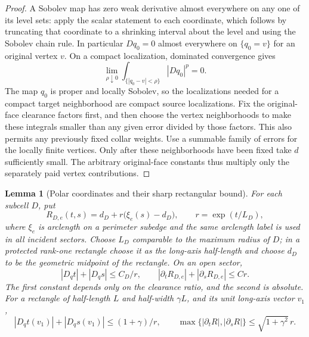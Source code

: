 \documentclass[11pt]{article}
\numberwithin{equation}{section}
\newtheorem{lemma}[theorem]{Lemma}
\theoremstyle{definition}
\theoremstyle{remark}
\begin{document}
\begin{proof}
A Sobolev map has zero weak derivative almost everywhere on any one
of its level sets: apply the scalar statement to each coordinate,
which follows by truncating that coordinate to a shrinking interval
about the level and using the Sobolev chain rule.  In particular
$Dq_0=0$ almost everywhere on $\{q_0=v\}$ for an original vertex $v$.
On a compact localization, dominated convergence gives
\[
 \lim_{\rho\downarrow0}
 \int_{\{|q_0-v|<\rho\}}|Dq_0|^p=0.
\]
The map $q_0$ is proper and locally Sobolev, so the localizations needed
for a compact target neighborhood are compact source localizations.
Fix the original-face clearance factors first, and then choose the
vertex neighborhoods to make these integrals smaller than any given
error divided by those factors.  This also permits any previously
fixed collar weights.  Use a summable family of errors for the locally
finite vertices.  Only after these neighborhoods have been fixed take
$d$ sufficiently small.  The arbitrary original-face constants thus
multiply only the separately paid vertex contributions.
\end{proof}

\begin{lemma}[Polar coordinates and their sharp rectangular bound]\label{qt:polar}
For each subcell $D$, put
\[
 R_{D,e}(t,s)=d_D+r\bigl(\xi_e(s)-d_D\bigr),\qquad
 r=\exp(t/L_D),
\]
where $\xi_e$ is arclength on a perimeter subedge and the same arclength
label is used in all incident sectors.  Choose $L_D$ comparable to the
maximum radius of $D$; in a protected rank-one rectangle choose it
as the long-axis half-length and choose $d_D$ to be the geometric
midpoint of the rectangle.  On an open sector,
\begin{equation}\label{qt:polar-bounds}
 |D_qt|+|D_qs|\leq C_D/r,\qquad
 |\partial_tR_{D,e}|+|\partial_sR_{D,e}|\leq C r.
\end{equation}
The first constant depends only on the clearance ratio, and the second
is absolute.  For a rectangle of half-length $L$ and half-width
$\gamma L$, and its unit long-axis vector $v_1$,
\begin{equation}\label{qt:rank-one-polar}
 |D_qt(v_1)|+|D_qs(v_1)|\leq(1+\gamma)/r,
 \qquad
 \max\{|\partial_tR|,|\partial_sR|\}
 \leq\sqrt{1+\gamma^2}\,r.
\end{equation}
\end{lemma}
\end{document}
